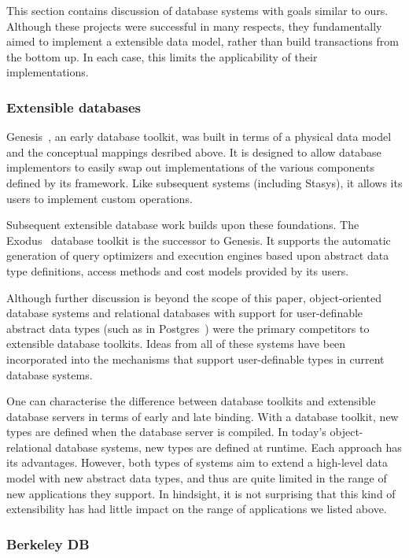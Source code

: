 \documentclass[letterpaper,twocolumn,10pt]{article}
\newcommand{\yad}{Stasys\xspace}
\begin{document}
This section contains discussion of database systems with goals similar to ours.
Although these projects were
successful in many respects, they fundamentally aimed to implement a
extensible data model, rather than build transactions from the bottom up.
In each case, this limits the applicability of their implementations.

\subsubsection{Extensible databases}

Genesis~\cite{genesis}, an early database toolkit, was built in terms
of a physical data model and the conceptual mappings desribed above.
It is designed to allow database implementors to easily swap out
implementations of the various components defined by its framework.
Like subsequent systems (including \yad), it allows its users to
implement custom operations.

Subsequent extensible database work builds upon these foundations.
The Exodus~\cite{exodus} database toolkit is the successor to
Genesis. It supports the automatic generation of query optimizers and
execution engines based upon abstract data type definitions, access
methods and cost models provided by its users.

Although further discussion is beyond the scope of this paper,
object-oriented database systems and relational databases with
support for user-definable abstract data types (such as in
Postgres~\cite{postgres}) were the primary competitors to extensible
database toolkits.  Ideas from all of these systems have been
incorporated into the mechanisms that support user-definable types in
current database systems.

One can characterise the difference between database toolkits and
extensible database servers in terms of early and late binding.  With
a database toolkit, new types are defined when the database server is
compiled.  In today's object-relational database systems, new types
are defined at runtime.  Each approach has its advantages.  However,
both types of systems aim to extend a high-level data model with new 
abstract data types, and thus are quite limited in the range of new 
applications they support.  In hindsight, it is not surprising that this kind of 
extensibility has had little impact on the range of applications 
we listed above.

\subsubsection{Berkeley DB}
\end{document}
